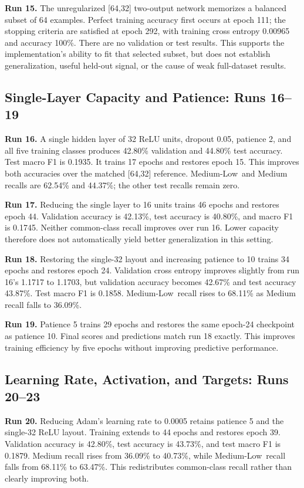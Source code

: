 \documentclass[11pt,letterpaper]{article}
\newcommand{\ML}{Medium-Low}
\newcommand{\run}[1]{\textbf{Run #1.}}
\begin{document}
\run{15} The unregularized [64,32] two-output network memorizes a balanced subset of 64 examples. Perfect training accuracy first occurs at epoch 111; the stopping criteria are satisfied at epoch 292, with training cross entropy 0.00965 and accuracy 100\%. There are no validation or test results. This supports the implementation's ability to fit that selected subset, but does not establish generalization, useful held-out signal, or the cause of weak full-dataset results.

\subsection{Single-Layer Capacity and Patience: Runs 16--19}
\run{16} A single hidden layer of 32 ReLU units, dropout 0.05, patience 2, and all five training classes produces 42.80\% validation and 44.80\% test accuracy. Test macro F1 is 0.1935. It trains 17 epochs and restores epoch 15. This improves both accuracies over the matched [64,32] reference. \ML\ and Medium recalls are 62.54\% and 44.37\%; the other test recalls remain zero.

\run{17} Reducing the single layer to 16 units trains 46 epochs and restores epoch 44. Validation accuracy is 42.13\%, test accuracy is 40.80\%, and macro F1 is 0.1745. Neither common-class recall improves over run 16. Lower capacity therefore does not automatically yield better generalization in this setting.

\run{18} Restoring the single-32 layout and increasing patience to 10 trains 34 epochs and restores epoch 24. Validation cross entropy improves slightly from run 16's 1.1717 to 1.1703, but validation accuracy becomes 42.67\% and test accuracy 43.87\%. Test macro F1 is 0.1858. \ML\ recall rises to 68.11\% as Medium recall falls to 36.09\%.

\run{19} Patience 5 trains 29 epochs and restores the same epoch-24 checkpoint as patience 10. Final scores and predictions match run 18 exactly. This improves training efficiency by five epochs without improving predictive performance.

\subsection{Learning Rate, Activation, and Targets: Runs 20--23}
\run{20} Reducing Adam's learning rate to 0.0005 retains patience 5 and the single-32 ReLU layout. Training extends to 44 epochs and restores epoch 39. Validation accuracy is 42.80\%, test accuracy is 43.73\%, and test macro F1 is 0.1879. Medium recall rises from 36.09\% to 40.73\%, while \ML\ recall falls from 68.11\% to 63.47\%. This redistributes common-class recall rather than clearly improving both.
\end{document}
